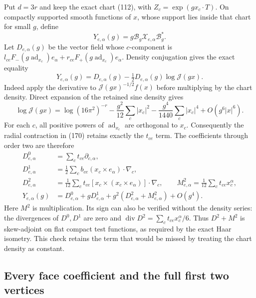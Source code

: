 \documentclass[11pt]{article}
\begin{document}
Put $d=3r$ and keep the exact chart (112), with
$Z_c=\exp(gx_c\cdot T)$. On compactly supported smooth functions of
$x$, whose support lies inside that chart for small $g$, define
\[
 Y_{e,\alpha}(g)=g\mathcal B_g\mathcal X_{e,\alpha}\mathcal B_g^*.
\]
Let $D_{e,\alpha}(g)$ be the vector field whose $c$-component is
$l_{ce}F_-(g\operatorname{ad}_{x_c})e_\alpha+
r_{ce}F_+(g\operatorname{ad}_{x_c})e_\alpha$.
Density conjugation gives the exact equality
\begin{equation}\label{eq:vertex-exact-field}
 Y_{e,\alpha}(g)=D_{e,\alpha}(g)
                 -\tfrac12D_{e,\alpha}(g)\log\mathcal J(gx).
\end{equation}
Indeed apply the derivative to $\mathcal J(gx)^{-1/2}f(x)$
before multiplying by the chart density. Direct expansion of the
retained sine density gives
\[
 \log\mathcal J(gx)=\log(16\pi^2)^{-r}
       -\frac{g^2}{12}\sum_c|x_c|^2
       -\frac{g^4}{1440}\sum_c|x_c|^4+O(g^6|x|^6).
\]
For each $c$, all positive powers of $\operatorname{ad}_{x_c}$
are orthogonal to $x_c$. Consequently the radial contraction in
(170) retains exactly the $t_{ce}$ term.
The coefficients through order two are therefore
\begin{align}
 D^0_{e,\alpha}&=\sum_c t_{ce}\partial_{c,\alpha},\nonumber\\
 D^1_{e,\alpha}&=\tfrac12\sum_c b_{ce}
                   (x_c\times e_\alpha)\cdot\nabla_c,\nonumber\\
 D^2_{e,\alpha}&=\tfrac1{12}\sum_c t_{ce}
          [x_c\times(x_c\times e_\alpha)]\cdot\nabla_c,
 \qquad M^2_{e,\alpha}=\tfrac1{12}\sum_c t_{ce}x_c^\alpha,
       \label{eq:vertex-fields}\\
 Y_{e,\alpha}(g)&=D^0_{e,\alpha}+gD^1_{e,\alpha}
                   +g^2(D^2_{e,\alpha}+M^2_{e,\alpha})+O(g^4).
       \nonumber
\end{align}
Here $M^2$ is multiplication. Its sign can also be verified without
the density series: the divergences of $D^0,D^1$ are zero and
$\operatorname{div}D^2=\sum_ct_{ce}x_c^\alpha/6$.
Thus $D^2+M^2$ is skew-adjoint on flat compact test functions,
as required by the exact Haar isometry. This check retains the
term that would be missed by treating the chart density as constant.

\subsection{Every face coefficient and the full first two vertices}
\end{document}
